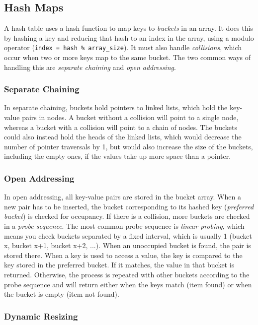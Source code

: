 \subsection{Hash Maps}

A hash table uses a hash function to map keys to \textit{buckets} in an array. It does this by hashing a key and reducing that hash to an index in the array, using a modulo operator (\texttt{index = hash \% array\_size}). It must also handle \textit{collisions}, which occur when two or more keys map to the same bucket. The two common ways of handling this are \textit{separate chaining} and \textit{open addressing}.

\subsubsection{Separate Chaining}

In separate chaining, buckets hold pointers to linked lists, which hold the key-value pairs in nodes. A bucket without a collision will point to a single node, whereas a bucket with a collision will point to a chain of nodes. The buckets could also instead hold the heads of the linked lists, which would decrease the number of pointer traversals by 1, but would also increase the size of the buckets, including the empty ones, if the values take up more space than a pointer.

\subsubsection{Open Addressing}

In open addressing, all key-value pairs are stored in the bucket array. When a new pair has to be inserted, the bucket corresponding to its hashed key (\textit{preferred bucket}) is checked for occupancy. If there is a collision, more buckets are checked in a \textit{probe sequence}. The most common probe sequence is \textit{linear probing}, which means you check buckets separated by a fixed interval, which is usually 1 (bucket x, bucket x+1, bucket x+2, ...). When an unoccupied bucket is found, the pair is stored there. When a key is used to access a value, the key is compared to the key stored in the preferred bucket. If it matches, the value in that bucket is returned. Otherwise, the process is repeated with other buckets according to the probe sequence and will return either when the keys match (item found) or when the bucket is empty (item not found).

\subsubsection{Dynamic Resizing}

